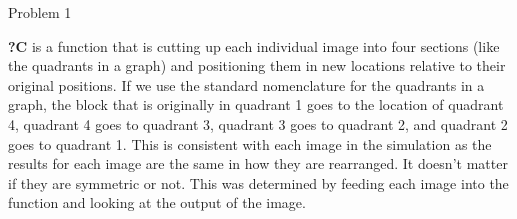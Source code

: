 \begin{problem}{Problem 1}
\begin{Highlight}[Solution]
        \textbf{?C} is a function that is cutting up each individual image into four sections (like the quadrants in a graph) and positioning them in new locations relative to their original positions. 
        If we use the standard nomenclature for the quadrants in a graph, the block that is originally in quadrant 1 goes to the location of quadrant 4, quadrant 4 goes to quadrant 3, quadrant 3 goes to 
        quadrant 2, and quadrant 2 goes to quadrant 1. This is consistent with each image in the simulation as the results for each image are the same in how they are rearranged. It doesn't matter if 
        they are symmetric or not. This was determined by feeding each image into the function and looking at the output of the image.
    \end{Highlight}
\end{problem}

